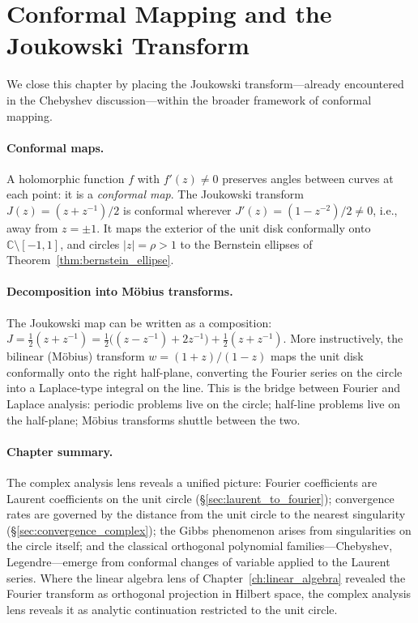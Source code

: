 \documentclass[12pt,a4paper]{report}
\theoremstyle{thms}
\theoremstyle{defns}
\begin{document}
\section{Conformal Mapping and the Joukowski Transform}
\label{sec:conformal}

We close this chapter by placing the Joukowski transform—already encountered in the Chebyshev discussion—within the broader framework of conformal mapping.

\paragraph{Conformal maps.} A holomorphic function $f$ with $f'(z) \neq 0$ preserves angles between curves at each point: it is a \textit{conformal map}. The Joukowski transform $J(z) = (z + z^{-1})/2$ is conformal wherever $J'(z) = (1 - z^{-2})/2 \neq 0$, i.e., away from $z = \pm 1$. It maps the exterior of the unit disk conformally onto $\mathbb{C} \setminus [-1, 1]$, and circles $|z| = \rho > 1$ to the Bernstein ellipses of Theorem~\ref{thm:bernstein_ellipse}.

\paragraph{Decomposition into M\"{o}bius transforms.} The Joukowski map can be written as a composition: $J = \frac{1}{2}(z + z^{-1}) = \frac{1}{2}\bigl((z - z^{-1}) + 2z^{-1}\bigr) + \frac{1}{2}(z + z^{-1})$. More instructively, the bilinear (M\"{o}bius) transform $w = (1 + z)/(1 - z)$ maps the unit disk conformally onto the right half-plane, converting the Fourier series on the circle into a Laplace-type integral on the line. This is the bridge between Fourier and Laplace analysis: periodic problems live on the circle; half-line problems live on the half-plane; M\"{o}bius transforms shuttle between the two.

\paragraph{Chapter summary.} The complex analysis lens reveals a unified picture: Fourier coefficients are Laurent coefficients on the unit circle (\S\ref{sec:laurent_to_fourier}); convergence rates are governed by the distance from the unit circle to the nearest singularity (\S\ref{sec:convergence_complex}); the Gibbs phenomenon arises from singularities on the circle itself; and the classical orthogonal polynomial families—Chebyshev, Legendre—emerge from conformal changes of variable applied to the Laurent series. Where the linear algebra lens of Chapter~\ref{ch:linear_algebra} revealed the Fourier transform as orthogonal projection in Hilbert space, the complex analysis lens reveals it as analytic continuation restricted to the unit circle.
\end{document}
